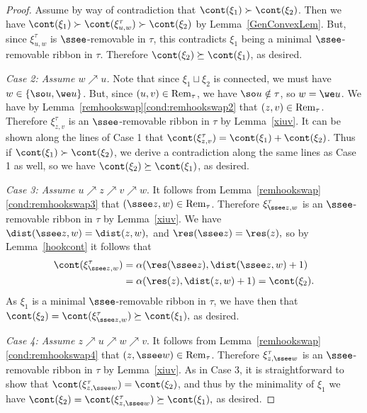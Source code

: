 \begin{proof}
Assume by way of contradiction that \(\cont(\xi_1) \succ \cont(\xi_2)\). Then we have \(\cont(\xi_1) \succ \cont(\xi^\tau_{u,w}) \succ \cont(\xi_2)\) by Lemma~\ref{GenConvexLem}. But, since \(\xi^\tau_{u,w}\) is \(\ssee\)-removable in \(\tau\), this contradicts \(\xi_1\) being a minimal \(\ssee\)-removable ribbon in \(\tau\). Therefore \(\cont(\xi_2) \succeq \cont(\xi_1)\), as desired.

 {\em Case 2: Assume \(w \nearrow u\).} Note that since \(\xi_1 \sqcup \xi_2\) is connected, we must have \(w \in \{\so u, \we u\}\). But, since \((u,v) \in \textup{Rem}_\tau\),
we have \(\so u \notin \tau\), so \(w=\we u\). We have by Lemma~\ref{remhookswap}\eqref{cond:remhookswap2} that \((z,v) \in \textup{Rem}_\tau\). Therefore \(\xi^\tau_{z,v}\) is an \(\ssee\)-removable ribbon in \(\tau\) by Lemma~\ref{xiuv}. 
 It can be shown along the lines of Case 1 that \(\cont(\xi^\tau_{z,v}) = \cont(\xi_1) + \cont(\xi_2)\). Thus if \(\cont(\xi_1) \succ \cont(\xi_2)\), we derive a contradiction along the same lines as Case 1 as well, so we have \(\cont(\xi_2) \succeq \cont(\xi_1)\), as desired.
 
 {\em Case 3: Assume \(u \nearrow z \nearrow v \nearrow w\)}. It follows from Lemma~\ref{remhookswap}\eqref{cond:remhookswap3} that \((\ssee z, w) \in \textup{Rem}_\tau\). 
Therefore \(\xi^\tau_{\ssee z,w}\) is an \(\ssee\)-removable ribbon in \(\tau\) by Lemma~\ref{xiuv}.
 We have
\(
 \dist(\ssee z ,w) = \dist(z,w),
\)
 and
\(
 \res(\ssee z) =\res(z),
\)
 so by Lemma~\ref{hookcont} it follows that 
 \begin{align*}
 \cont(\xi^\tau_{\ssee z,w}) &= \alpha(\res(\ssee z), \dist(\ssee z,w)+1)\\
 &= \alpha(\res(z),\dist(z,w)+1) = \cont(\xi_2).
 \end{align*}
As \(\xi_1\) is a minimal \(\ssee\)-removable ribbon in \(\tau\), we have then that
\(
\cont(\xi_2) = \cont(\xi^\tau_{\ssee z,w}) \succeq \cont(\xi_1),
\)
as desired.

{\em Case 4: Assume \(z \nearrow u \nearrow w \nearrow v\)}. 
It follows from Lemma~\ref{remhookswap}\eqref{cond:remhookswap4} that \((z, \ssee w) \in \textup{Rem}_\tau\).
Therefore \(\xi^\tau_{z, \ssee w}\) is an \(\ssee\)-removable ribbon in \(\tau\) by Lemma~\ref{xiuv}.
As in Case 3, it is straightforward to show that \(\cont(\xi^\tau_{z, \ssee w}) = \cont(\xi_2)\), and thus by the minimality of \(\xi_1\) we have
\(
\cont(\xi_2) = \cont(\xi^\tau_{z, \ssee w}) \succeq \cont(\xi_1),
\)
as desired.


\end{proof}
